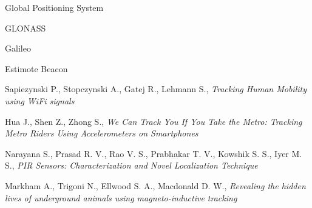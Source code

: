 \begin{thebibliography}{99}
  Global Positioning System
  
  GLONASS

  Galileo

  
  Estimote Beacon
  
   Sapiezynski P., Stopczynski A., Gatej R., Lehmann S.,
  \textit{Tracking Human Mobility using WiFi signals} 
  
   Hua J., Shen Z., Zhong S., 
  \textit{We Can Track You If You Take the Metro: Tracking Metro Riders Using Accelerometers on Smartphones}
  
   Narayana S., Prasad R. V., Rao V. S., Prabhakar  T. V., Kowshik S. S., Iyer M. S.,
  \textit{PIR Sensors: Characterization and Novel Localization Technique}
  
   Markham A., Trigoni N., Ellwood S. A., Macdonald D. W.,
  \textit{Revealing the hidden lives of underground animals using
magneto-inductive tracking}

  
\end{thebibliography}
